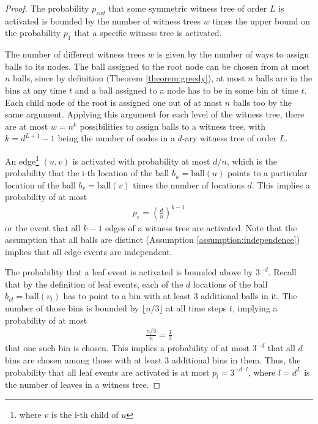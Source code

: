 \documentclass[a4paper,12pt]{article}
\begin{document}
\begin{proof}
The probability $p_{swt}$ that some symmetric witness tree of order $L$ is activated is bounded by the number of witness trees $w$ times the upper bound on the probability $p_1$ that a specific witness tree is activated.

The number of different witness trees $w$ is given by the number of ways to assign balls to its nodes. The ball assigned to the root node can be chosen from at most $n$ balls, since by definition (Theorem \ref{theorem:greedy}), at most $n$ balls are in the bins at any time $t$ and a ball assigned to a node has to be in some bin at time $t$. Each child node of the root is assigned one out of at most $n$ balls too by the same argument. Applying this argument for each level of the witness tree, there are at most $w = n^k$ possibilities to assign balls to a witness tree, with $k = d^{L+1}-1$ being the number of nodes in a $d$-ary witness tree of order $L$.
 
An edge\footnote{where $v$ is the i-th child of $u$} $(u, v)$ is activated with probability at most $d/n$, which is the probability that the i-th location of the ball $b_u = \mathrm{ball}(u)$ points to a particular location of the ball $b_v = \mathrm{ball}(v)$ times the number of locations $d$. This implies a probability of at most
\begin{align*}
p_e = \left(\frac{d}{n}\right)^{k-1}
\end{align*} 
or the event that all $k-1$ edges of a witness tree are activated. Note that  the assumption that all balls are distinct (Assumption \ref{assumption:independence}) implies that all edge events are independent.

The probability that a leaf event is activated is bounded above by $3^{-d}$. Recall that by the definition of leaf events, each of the $d$ locations of the ball $b_{vl} = \mathrm{ball}(v_l)$ has to point to a bin with at least 3 additional balls in it. The number of those bins is bounded by $\lfloor n/3 \rfloor$ at all time steps $t$, implying a probability of at most 
\begin{align*}
\frac{n/3}{n} = \frac{1}{3}
\end{align*}
that one such bin is chosen. This implies a probability of at most $3^{-d}$ that all $d$ bins are chosen among those with at least 3 additional bins in them. Thus, the probability that all leaf events are activated is at most $p_l = 3^{-d\cdot l}$, where $l = d^{L}$ is the number of leaves in a witness tree.


\end{proof}
\end{document}
